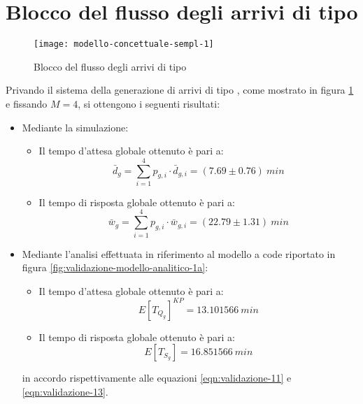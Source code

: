 \section{Blocco del flusso degli arrivi di tipo \sr{}}
\begin{figure}[ht]
\centering
\texttt{[image: modello-concettuale-sempl-1]}
\caption{Blocco del flusso degli arrivi di tipo \sr{}}
\label{fig:modello-concettuale-semp-1}
\end{figure}
Privando il sistema della generazione di arrivi di tipo \sr{}, come mostrato in figura \ref{fig:modello-concettuale-semp-1} e fissando $M=4$, si ottengono i seguenti risultati:
\begin{itemize}
\item Mediante la simulazione:
\begin{itemize}
\item Il tempo d'attesa globale ottenuto è pari a:
\begin{equation} 
\bar{d}_g = \sum_{i = 1}^4 p_{g,i}\cdot \bar{d}_{g,i} = (7.69 \pm 0.76)\ min
\end{equation}
\item Il tempo di risposta globale ottenuto è pari a:
\begin{equation}
\bar{w}_g = \sum_{i = 1}^4 p_{g,i}\cdot \bar{w}_{g,i} = (22.79 \pm 1.31)\ min
\end{equation}
\end{itemize}

\item Mediante l'analisi effettuata in riferimento al modello a code riportato in figura \ref{fig:validazione-modello-analitico-1a}:
\begin{itemize}
\item Il tempo d'attesa globale ottenuto è pari a:
\begin{equation}
E[T_{Q_g}]^{KP} = 13.101566\ min 
\end{equation}
\item Il tempo di risposta globale ottenuto è pari a:
\begin{equation}
E[T_{S_g}] = 16.851566\ min 
\end{equation}
\end{itemize}
in accordo rispettivamente alle equazioni \ref{eqn:validazione-11} e \ref{eqn:validazione-13}.
\end{itemize}

